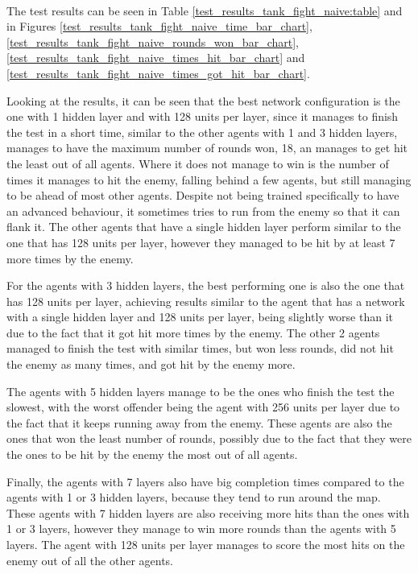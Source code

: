 \paragraph{}
The test results can be seen in Table \ref{test_results_tank_fight_naive:table} and in Figures \ref{test_results_tank_fight_naive_time_bar_chart}, \ref{test_results_tank_fight_naive_rounds_won_bar_chart}, \ref{test_results_tank_fight_naive_times_hit_bar_chart} and \ref{test_results_tank_fight_naive_times_got_hit_bar_chart}.

Looking at the results, it can be seen that the best network configuration is the one with 1 hidden layer and with 128 units per layer, since it manages to finish the test in a short time, similar to the other agents with 1 and 3 hidden layers, manages to have the maximum number of rounds won, 18, an manages to get hit the least out of all agents. Where it does not manage to win is the number of times it manages to hit the enemy, falling behind a few agents, but still managing to be ahead of most other agents. Despite not being trained specifically to have an advanced behaviour, it sometimes tries to run from the enemy so that it can flank it. The other agents that have a single hidden layer perform similar to the one that has 128 units per layer, however they managed to be hit by at least 7 more times by the enemy.

For the agents with 3 hidden layers, the best performing one is also the one that has 128 units per layer, achieving results similar to the agent that has a network with a single hidden layer and 128 units per layer, being slightly worse than it due to the fact that it got hit more times by the enemy. The other 2 agents managed to finish the test with similar times, but won less rounds, did not hit the enemy as many times, and got hit by the enemy more.

The agents with 5 hidden layers manage to be the ones who finish the test the slowest, with the worst offender being the agent with 256 units per layer due to the fact that it keeps running away from the enemy. These agents are also the ones that won the least number of rounds, possibly due to the fact that they were the ones to be hit by the enemy the most out of all agents.

Finally, the agents with 7 layers also have big completion times compared to the agents with 1 or 3 hidden layers, because they tend to run around the map. These agents with 7 hidden layers are also receiving more hits than the ones with 1 or 3 layers, however they manage to win more rounds than the agents with 5 layers. The agent with 128 units per layer manages to score the most hits on the enemy out of all the other agents.

